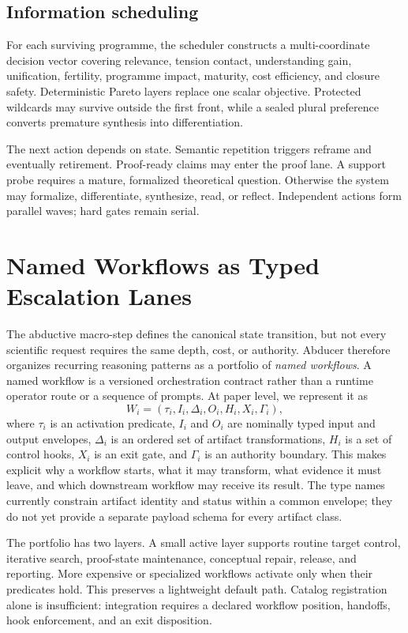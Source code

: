 \documentclass[11pt]{article}
\begin{document}
\subsection{Information scheduling}

For each surviving programme, the scheduler constructs a multi-coordinate decision vector covering relevance, tension contact, understanding gain, unification, fertility, programme impact, maturity, cost efficiency, and closure safety. Deterministic Pareto layers replace one scalar objective. Protected wildcards may survive outside the first front, while a sealed plural preference converts premature synthesis into differentiation.

The next action depends on state. Semantic repetition triggers reframe and eventually retirement. Proof-ready claims may enter the proof lane. A support probe requires a mature, formalized theoretical question. Otherwise the system may formalize, differentiate, synthesize, read, or reflect. Independent actions form parallel waves; hard gates remain serial.

\section{Named Workflows as Typed Escalation Lanes}
\label{sec:named-workflows}

The abductive macro-step defines the canonical state transition, but not every scientific request requires the same depth, cost, or authority. Abducer therefore organizes recurring reasoning patterns as a portfolio of \emph{named workflows}. A named workflow is a versioned orchestration contract rather than a runtime operator route or a sequence of prompts. At paper level, we represent it as
\[
  W_i=(\tau_i,I_i,\Delta_i,O_i,H_i,X_i,\Gamma_i),
\]
where $\tau_i$ is an activation predicate, $I_i$ and $O_i$ are nominally typed input and output envelopes, $\Delta_i$ is an ordered set of artifact transformations, $H_i$ is a set of control hooks, $X_i$ is an exit gate, and $\Gamma_i$ is an authority boundary. This makes explicit why a workflow starts, what it may transform, what evidence it must leave, and which downstream workflow may receive its result. The type names currently constrain artifact identity and status within a common envelope; they do not yet provide a separate payload schema for every artifact class.

The portfolio has two layers. A small active layer supports routine target control, iterative search, proof-state maintenance, conceptual repair, release, and reporting. More expensive or specialized workflows activate only when their predicates hold. This preserves a lightweight default path. Catalog registration alone is insufficient: integration requires a declared workflow position, handoffs, hook enforcement, and an exit disposition.
\end{document}
